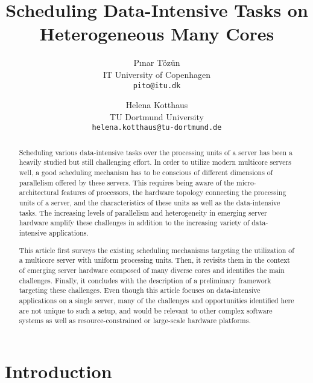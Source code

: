 \documentclass[11pt]{article}
\begin{document}
\newcommand{\reffig}[1]{Figure~\ref{fig:#1}}
\newcommand{\refsec}[1]{Section~\ref{sec:#1}}
\newcommand{\reftab}[1]{Table~\ref{tab:#1}}

\title{Scheduling Data-Intensive Tasks on Heterogeneous Many Cores}

\author{P{\i}nar T\"oz\"un \\ IT University of Copenhagen \\ \texttt{pito@itu.dk}
\and Helena Kotthaus \\ TU Dortmund University \\ \texttt{helena.kotthaus@tu-dortmund.de}}

\maketitle

\begin{abstract}

Scheduling various data-intensive tasks over the processing units of a server
has been a heavily studied but still challenging effort.
In order to utilize modern multicore servers well,
a good scheduling mechanism has to be conscious of different dimensions of parallelism offered by these servers.
This requires being aware of the micro-architectural features of processors,
the hardware topology connecting the processing units of a server,
and the characteristics of these units as well as the data-intensive tasks.
The increasing levels of parallelism and heterogeneity in emerging server hardware
amplify these challenges in addition to the increasing variety of data-intensive applications.

This article first surveys the existing scheduling mechanisms targeting
the utilization of a multicore server with uniform processing units. 
Then, it revisits them in the context of emerging server hardware composed of many diverse cores
and identifies the main challenges.
Finally, it concludes with the description of a preliminary framework targeting these challenges.
Even though this article focuses on data-intensive applications on a single server,
many of the challenges and opportunities identified here are not unique to such a setup,
and would be relevant to other complex software systems as well as
resource-constrained or large-scale hardware platforms. 

\end{abstract}

\section{Introduction}
\label{sec:intro}
\end{document}
